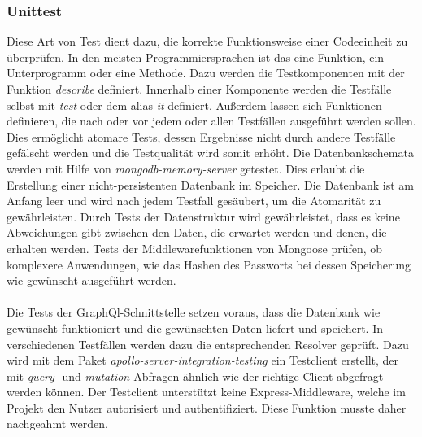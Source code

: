 \subsubsection*{Unittest}
Diese Art von Test dient dazu, die korrekte Funktionsweise einer Codeeinheit zu überprüfen. In den meisten Programmiersprachen ist das eine Funktion, ein Unterprogramm oder eine Methode. %
Dazu werden die Testkomponenten mit der Funktion \textit{describe} definiert. Innerhalb einer Komponente werden die Testfälle selbst mit \textit{test} oder dem alias \textit{it} definiert. Außerdem lassen sich Funktionen definieren, die nach oder vor jedem oder allen Testfällen ausgeführt werden sollen. Dies ermöglicht atomare Tests, dessen Ergebnisse nicht durch andere Testfälle gefälscht werden und die Testqualität wird somit erhöht. Die Datenbankschemata werden mit Hilfe von \textit{mongodb-memory-server} getestet. Dies erlaubt die Erstellung einer nicht-persistenten Datenbank im Speicher. Die Datenbank ist am Anfang leer und wird nach jedem Testfall gesäubert, um die Atomarität zu gewährleisten.
Durch Tests der Datenstruktur wird gewährleistet, dass es keine Abweichungen gibt zwischen den Daten, die erwartet werden und denen, die erhalten werden. Tests der Middlewarefunktionen von Mongoose prüfen, ob komplexere Anwendungen, wie das Hashen des Passworts bei dessen Speicherung wie gewünscht ausgeführt werden.
\\\\
Die Tests der GraphQl-Schnittstelle setzen voraus, dass die Datenbank wie gewünscht funktioniert und die gewünschten Daten liefert und speichert.
In verschiedenen Testfällen werden dazu die entsprechenden Resolver geprüft. Dazu wird mit dem Paket \textit{apollo-server-integration-testing} ein Testclient erstellt, der mit \textit{query-} und \textit{mutation-}Abfragen ähnlich wie der richtige Client abgefragt werden können. Der Testclient unterstützt keine Express-Middleware, welche im Projekt den Nutzer autorisiert und authentifiziert. Diese Funktion musste daher nachgeahmt werden. 


